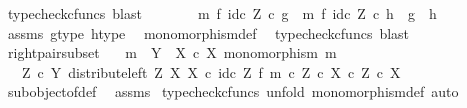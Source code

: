 \begin{isabellebody}
\ {\isacharparenleft}{\kern0pt}typecheck{\isacharunderscore}{\kern0pt}cfuncs{\isacharcomma}{\kern0pt}\ blast{\isacharparenright}{\kern0pt}\isanewline
\ \ \ \ \isamarkupfalse%
\ \isamarkupfalse%
\ {\isachardoublequoteopen}{\isacharparenleft}{\kern0pt}m\ {\isasymtimes}\isactrlsub f\ id\isactrlsub c\ Z{\isacharparenright}{\kern0pt}\ {\isasymcirc}\isactrlsub c\ g\ {\isacharequal}{\kern0pt}\ {\isacharparenleft}{\kern0pt}m\ {\isasymtimes}\isactrlsub f\ id\isactrlsub c\ Z{\isacharparenright}{\kern0pt}\ {\isasymcirc}\isactrlsub c\ h\ {\isasymLongrightarrow}\ g\ {\isacharequal}{\kern0pt}\ h{\isachardoublequoteclose}\isanewline
\ \ \ \ \ \ \isamarkupfalse%
\ assms\ g{\isacharunderscore}{\kern0pt}type\ h{\isacharunderscore}{\kern0pt}type\ \isamarkupfalse%
\ monomorphism{\isacharunderscore}{\kern0pt}def{}\ \isamarkupfalse%
\ {\isacharparenleft}{\kern0pt}typecheck{\isacharunderscore}{\kern0pt}cfuncs{\isacharcomma}{\kern0pt}\ blast{\isacharparenright}{\kern0pt}\isanewline
\ \ \isamarkupfalse%
\isanewline
{}\isamarkupfalse%
%
\endisatagproof
{\isafoldproof}%
%
\isadelimproof
\isanewline
%
\endisadelimproof
\isanewline
{}\isamarkupfalse%
\ right{\isacharunderscore}{\kern0pt}pair{\isacharunderscore}{\kern0pt}subset{\isacharcolon}{\kern0pt}\isanewline
\ \ \ {\isachardoublequoteopen}m\ {\isacharcolon}{\kern0pt}\ Y\ {\isasymrightarrow}\ X\ {\isasymtimes}\isactrlsub c\ X{\isachardoublequoteclose}\ {\isachardoublequoteopen}monomorphism\ m{\isachardoublequoteclose}\isanewline
\ \ \ {\isachardoublequoteopen}{\isacharparenleft}{\kern0pt}Z\ {\isasymtimes}\isactrlsub c\ Y{\isacharcomma}{\kern0pt}\ distribute{\isacharunderscore}{\kern0pt}left\ Z\ X\ X\ {\isasymcirc}\isactrlsub c\ {\isacharparenleft}{\kern0pt}id\isactrlsub c\ Z\ {\isasymtimes}\isactrlsub f\ m{\isacharparenright}{\kern0pt}{\isacharparenright}{\kern0pt}\ {\isasymsubseteq}\isactrlsub c\ {\isacharparenleft}{\kern0pt}Z\ {\isasymtimes}\isactrlsub c\ X{\isacharparenright}{\kern0pt}\ {\isasymtimes}\isactrlsub c\ {\isacharparenleft}{\kern0pt}Z\ {\isasymtimes}\isactrlsub c\ X{\isacharparenright}{\kern0pt}{\isachardoublequoteclose}\isanewline
%
\isadelimproof
\ \ %
\endisadelimproof
%
\isatagproof
{}\isamarkupfalse%
\ subobject{\isacharunderscore}{\kern0pt}of{\isacharunderscore}{\kern0pt}def{}\ \isamarkupfalse%
\ assms\isanewline
{}\isamarkupfalse%
\ {\isacharparenleft}{\kern0pt}typecheck{\isacharunderscore}{\kern0pt}cfuncs{\isacharcomma}{\kern0pt}\ unfold\ monomorphism{\isacharunderscore}{\kern0pt}def{}{\isacharcomma}{\kern0pt}\ auto{\isacharparenright}{\kern0pt}\isanewline

\end{isabellebody}
